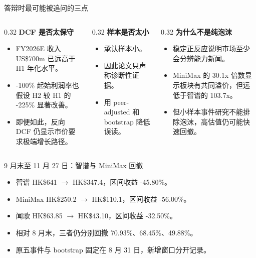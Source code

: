 \documentclass[aspectratio=169,11pt]{beamer}
\newcommand{\smallnote}[1]{\vspace{0.2em}{\footnotesize #1}}
\begin{document}
\begin{frame}{答辩时最可能被追问的三点}
  \begin{columns}[T,onlytextwidth]
    \begin{column}{0.32\textwidth}
      \textbf{DCF 是否太保守}
      \begin{itemize}
        \item FY2026E 收入 US\$700m 已远高于 H1 年化水平。
        \item -100\% 起始利润率也假设 H2 较 H1 的 -225\% 显著改善。
        \item 即便如此，反向 DCF 仍显示市价要求极端增长路径。
      \end{itemize}
    \end{column}
    \begin{column}{0.32\textwidth}
      \textbf{样本是否太小}
      \begin{itemize}
        \item 承认样本小。
        \item 因此论文只声称诊断性证据。
        \item 用 peer-adjusted 和 bootstrap 降低误读。
      \end{itemize}
    \end{column}
    \begin{column}{0.32\textwidth}
      \textbf{为什么不是纯泡沫}
      \begin{itemize}
        \item 稳定正反应说明市场至少会分辨能力新闻。
        \item MiniMax 的 30.1x 倍数显示板块有共同溢价，但远低于智谱的 103.7x。
        \item 但小样本事件研究不能排除泡沫，高估值仍可能快速回撤。
      \end{itemize}
    \end{column}
  \end{columns}
\end{frame}

\begin{frame}{9 月末至 11 月 27 日：智谱与 MiniMax 回撤}
  \begin{itemize}
    \item 智谱 HK\$641 $\rightarrow$ HK\$347.4，区间收益 -45.80\%。
    \item MiniMax HK\$250.2 $\rightarrow$ HK\$110.1，区间收益 -56.00\%。
    \item 闻歌 HK\$63.85 $\rightarrow$ HK\$43.10，区间收益 -32.50\%。
    \item 相对 8 月末，三者仍分别回撤 70.93\%、68.45\%、49.88\%。
    \item 原五事件与 bootstrap 固定在 8 月 31 日，新增窗口分开记录。
  \end{itemize}
  \smallnote{港股截至 11 月 27 日，美股截至 11 月 25 日；区间收益不识别新闻因果效应。}
\end{frame}
\end{document}
